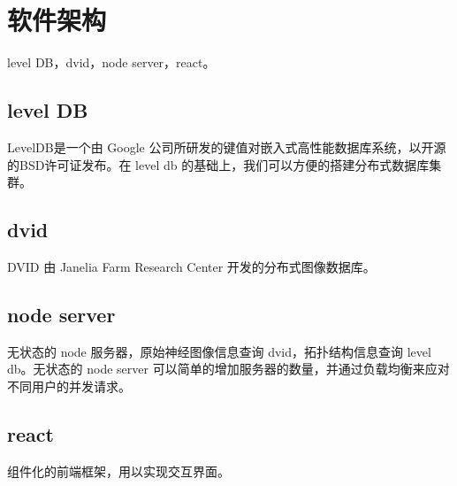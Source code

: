 \chapter{软件架构}

level DB，dvid，node server，react。



\section{level DB}
LevelDB是一个由 Google 公司所研发的键值对嵌入式高性能数据库系统，以开源的BSD许可证发布。在 level db 的基础上，我们可以方便的搭建分布式数据库集群。

\section{dvid}
DVID 由 Janelia Farm Research Center 开发的分布式图像数据库。

\section{node server}
无状态的 node 服务器，原始神经图像信息查询 dvid，拓扑结构信息查询 level db。无状态的 node server 可以简单的增加服务器的数量，并通过负载均衡来应对不同用户的并发请求。

\section{react}
组件化的前端框架，用以实现交互界面。